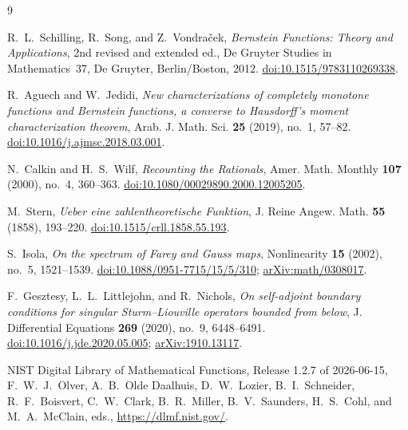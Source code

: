 \documentclass{article}
\theoremstyle{definition}
\theoremstyle{remark}
\begin{document}
\begin{thebibliography}{9}

R.~L.~Schilling, R.~Song, and Z.~Vondra\v{c}ek,
\emph{Bernstein Functions: Theory and Applications},
2nd revised and extended ed., De Gruyter Studies in Mathematics~37,
De Gruyter, Berlin/Boston, 2012.
\href{https://doi.org/10.1515/9783110269338}
     {doi:10.1515/9783110269338}.

R.~Aguech and W.~Jedidi,
\emph{New characterizations of completely monotone functions and Bernstein
functions, a converse to Hausdorff's moment characterization theorem},
Arab. J. Math. Sci. \textbf{25} (2019), no.~1, 57--82.
\href{https://doi.org/10.1016/j.ajmsc.2018.03.001}
     {doi:10.1016/j.ajmsc.2018.03.001}.

N.~Calkin and H.~S.~Wilf,
\emph{Recounting the Rationals},
Amer. Math. Monthly \textbf{107} (2000), no.~4, 360--363.
\href{https://doi.org/10.1080/00029890.2000.12005205}
     {doi:10.1080/00029890.2000.12005205}.

M.~Stern,
\emph{Ueber eine zahlentheoretische Funktion},
J. Reine Angew. Math. \textbf{55} (1858), 193--220.
\href{https://doi.org/10.1515/crll.1858.55.193}
     {doi:10.1515/crll.1858.55.193}.

S.~Isola,
\emph{On the spectrum of Farey and Gauss maps},
Nonlinearity \textbf{15} (2002), no.~5, 1521--1539.
\href{https://doi.org/10.1088/0951-7715/15/5/310}
     {doi:10.1088/0951-7715/15/5/310};
\href{https://arxiv.org/abs/math/0308017}{arXiv:math/0308017}.

F.~Gesztesy, L.~L.~Littlejohn, and R.~Nichols,
\emph{On self-adjoint boundary conditions for singular Sturm--Liouville
operators bounded from below},
J. Differential Equations \textbf{269} (2020), no.~9, 6448--6491.
\href{https://doi.org/10.1016/j.jde.2020.05.005}
     {doi:10.1016/j.jde.2020.05.005};
\href{https://arxiv.org/abs/1910.13117}{arXiv:1910.13117}.

NIST Digital Library of Mathematical Functions,
Release 1.2.7 of 2026-06-15,
F.~W.~J.~Olver, A.~B.~Olde Daalhuis, D.~W.~Lozier,
B.~I.~Schneider, R.~F.~Boisvert, C.~W.~Clark,
B.~R.~Miller, B.~V.~Saunders, H.~S.~Cohl,
and M.~A.~McClain, eds.,
\url{https://dlmf.nist.gov/}.

\end{thebibliography}
\end{document}
